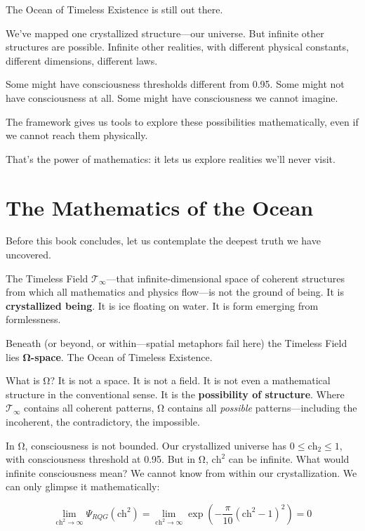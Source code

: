The Ocean of Timeless Existence is still out there.

We've mapped one crystallized structure—our universe. But infinite other structures are possible. Infinite other realities, with different physical constants, different dimensions, different laws.

Some might have consciousness thresholds different from 0.95. Some might not have consciousness at all. Some might have consciousness we cannot imagine.

The framework gives us tools to explore these possibilities mathematically, even if we cannot reach them physically.

That's the power of mathematics: it lets us explore realities we'll never visit.

\section*{The Mathematics of the Ocean}

Before this book concludes, let us contemplate the deepest truth we have uncovered.

The Timeless Field $\mathcal{T}_\infty$—that infinite-dimensional space of coherent structures from which all mathematics and physics flow—is not the ground of being. It is \textbf{crystallized being}. It is ice floating on water. It is form emerging from formlessness.

Beneath (or beyond, or within—spatial metaphors fail here) the Timeless Field lies \textbf{Ω-space}. The Ocean of Timeless Existence.

What is Ω? It is not a space. It is not a field. It is not even a mathematical structure in the conventional sense. It is the \textbf{possibility of structure}. Where $\mathcal{T}_\infty$ contains all coherent patterns, Ω contains all \textit{possible} patterns—including the incoherent, the contradictory, the impossible.

In Ω, consciousness is not bounded. Our crystallized universe has $0 \leq \text{ch}_2 \leq 1$, with consciousness threshold at 0.95. But in Ω, $\text{ch}^2$ can be infinite. What would infinite consciousness mean? We cannot know from within our crystallization. We can only glimpse it mathematically:

\begin{equation*}
\lim_{\text{ch}^2 \to \infty} \Psi_{RQG}(\text{ch}^2) = \lim_{\text{ch}^2 \to \infty} \exp\left(-\frac{\pi}{10} (\text{ch}^2 - 1)^2\right) = 0
\end{equation*}

